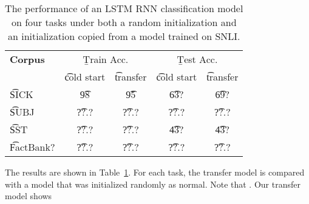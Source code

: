 \begin{table}
\begin{center}
\begin{tabular}{l@{\hskip \colspaceL}c@{\hskip \colspaceS}c@{\hskip \colspaceS}c@{\hskip \colspaceS}c}
\hline
\textbf{Corpus} & \multicolumn{2}{c}{\b{Train Acc.}} &\multicolumn{2}{c}{ \b{Test Acc.}} \\
 & \t{cold start} & \t{transfer} & \t{cold start} & \t{transfer}  \\
\hline
\t{SICK}            & \t{98} & \t{95} & \t{63?} & \t{69?}  \\
\t{SUBJ}          & \t{??.?} & \t{??.?} & \t{??.?} & \t{??.?} \\
\t{SST}          & \t{??.?} & \t{??.?} & \t{43?} & \t{43?} \\
\t{FactBank?}          & \t{??.?} & \t{??.?} & \t{??.?} & \t{??.?} \\
\hline
\end{tabular}
\end{center}
\caption{\label{tab:transferresults}
The performance of an LSTM RNN classification model on four tasks under both a random initialization and an initialization copied from a model trained on SNLI.
}
\end{table}

The results are shown in Table~\ref{tab:transferresults}. For each task, the transfer model is compared with a model that was initialized randomly as normal. Note that . Our transfer model shows 